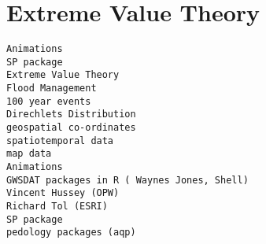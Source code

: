\documentclass[]{article}
\title{}
\author{}
\begin{document}
\maketitle

\begin{abstract}

\end{abstract}

\section{Extreme Value Theory}

\begin{verbatim}
Animations
SP package
Extreme Value Theory
Flood Management
100 year events
Direchlets Distribution
geospatial co-ordinates
spatiotemporal data
map data
Animations
GWSDAT packages in R ( Waynes Jones, Shell)
Vincent Hussey (OPW)
Richard Tol (ESRI)
SP package
pedology packages (aqp)
\end{verbatim}
\end{document}
